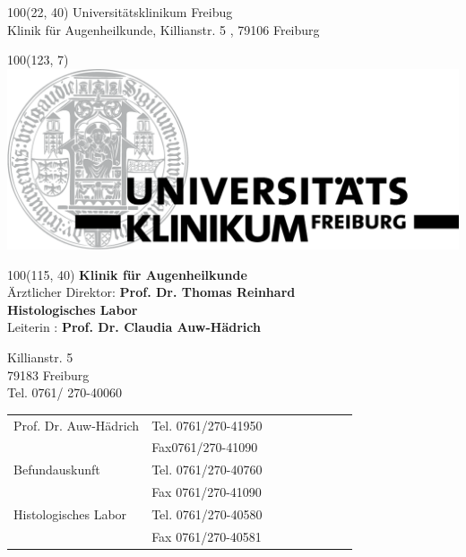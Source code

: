 \documentclass[12pt]{g-brief}
\begin{document}
\baselineskip10pt

\textblockorigin{0in}{0in}
\setlength{\TPHorizModule}{1mm}
\setlength{\TPVertModule}{1mm}

{

\begin{textblock}{100}(22, 40) 
\noindent 
\scriptsize
Universitätsklinikum Freibug\\
\scriptsize
Klinik für Augenheilkunde, Killianstr. 5 , 79106 Freiburg
\end{textblock}
}


{
\begin{textblock}{100}(123, 7) 
\includegraphics[scale=0.25]{Formuladr.png}
\end{textblock}
}


{

\begin{textblock}{100}(115, 40) 
\normalsize
\textbf{Klinik für Augenheilkunde} \\
\footnotesize
Ärztlicher Direktor: \textbf{Prof. Dr. Thomas Reinhard}\\


\textbf{Histologisches Labor}\\
Leiterin : \textbf{Prof. Dr. Claudia Auw-Hädrich}

\footnotesize
Killianstr. 5\\
79183 Freiburg\\
Tel. 0761/ 270-40060\\

\begin{tabular}{@{}p{0.4\linewidth}p{0.6\linewidth}}
Prof. Dr. Auw-Hädrich & Tel. 0761/270-41950 \\
 & Fax0761/270-41090\\[1.5mm]
 
 Befundauskunft & Tel. 0761/270-40760 \\
 & Fax 0761/270-41090\\[1.5mm]
 
  Histologisches Labor & Tel. 0761/270-40580 \\
 &Fax 0761/270-40581
 \end{tabular}
\end{textblock}
}



\begin{g-brief}
 \end{g-brief}
\end{document}
